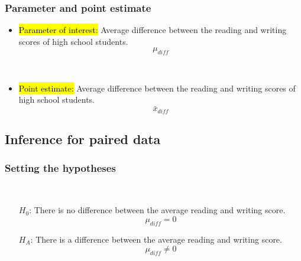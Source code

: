 \documentclass[notes,11pt, aspectratio=169]{beamer}
\begin{document}

\begin{frame}
\frametitle{Parameter and point estimate}

\begin{itemize}

\item \hl{Parameter of interest:} Average difference between the reading and writing scores of  high school students.
\[ \mu_{diff} \]

$\:$ \\

\pause

\item \hl{Point estimate:} Average difference between the reading and writing scores of  high school students.
\[ \bar{x}_{diff} \]

\end{itemize}

\end{frame}


\subsection{Inference for paired data}

\begin{frame}
\frametitle{Setting the hypotheses}


\pause


$\:$ \\

\pause


\pause

\begin{itemize}
\item[$H_0$:] There is no difference between the average reading and writing score. 
\[ \mu_{diff} = 0 \]
\item[$H_A$:] There is a difference between the average reading and writing score. 
\[ \mu_{diff} \ne 0 \]
\end{itemize}

\end{frame}
\end{document}

